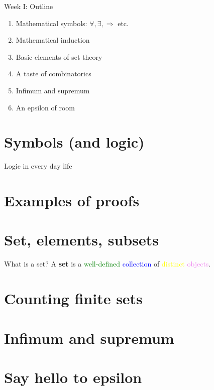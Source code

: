 \documentclass[aspectratio=1610]{beamer}
\begin{document}
\begin{frame}{Week I: Outline}
\begin{enumerate}
  \item Mathematical symbols: $\forall, \exists, \Rightarrow$ etc.\newline
  \item Mathematical induction\newline
  \item Basic elements of set theory\newline
  \item A taste of combinatorics\newline
  \item Infimum and supremum\newline
  \item An epsilon of room
\end{enumerate}
\end{frame}

\section{Symbols (and logic)}

\begin{frame}{Logic in every day life}
\end{frame}

\section{Examples of proofs}

\section{Set, elements, subsets}

\begin{frame}[t]{What is a set?}
A \textbf{set} is a \textcolor{green}{well-defined} \textcolor{blue}{collection} of \textcolor{yellow}{distinct} \textcolor{violet}{objects}.
\end{frame}

\section{Counting finite sets}

\section{Infimum and supremum}

\section{Say hello to epsilon}
\end{document}
